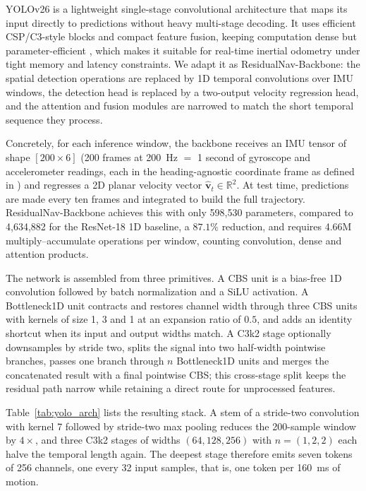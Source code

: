 \documentclass[10pt,conference,letterpaper]{IEEEtran}
\begin{document}
YOLOv26 is a lightweight single-stage convolutional architecture that
maps its input directly to predictions without heavy multi-stage
decoding. It uses efficient CSP/C3-style blocks and compact feature
fusion, keeping computation dense but parameter-efficient
\cite{yolo26_2025}, which makes it suitable for real-time inertial
odometry under tight memory and latency constraints. We adapt it as
ResidualNav-Backbone: the spatial detection operations are replaced by 1D
temporal convolutions over IMU windows, the detection head is replaced
by a two-output velocity regression head, and the attention and fusion
modules are narrowed to match the short temporal sequence they process.

Concretely, for each inference window, the backbone receives an IMU
tensor of shape $[200 \times 6]$ (200 frames at 200~Hz $=$ 1 second
of gyroscope and accelerometer readings, each in the heading-agnostic
coordinate frame as defined in \cite{ronin2019}) and regresses a 2D
planar velocity vector $\hat{\mathbf{v}}_t \in \mathbb{R}^2$. At test
time, predictions are made every ten frames and integrated to build
the full trajectory. ResidualNav-Backbone achieves this with only 598,530
parameters, compared to 4,634,882 for the ResNet-18 1D baseline, a
$\mathbf{87.1\%}$ reduction, and requires 4.66M multiply--accumulate
operations per window, counting convolution, dense and attention
products.

The network is assembled from three primitives. A CBS unit is a
bias-free 1D convolution followed by batch normalization and a SiLU
activation. A Bottleneck1D unit contracts and restores channel width
through three CBS units with kernels of size 1, 3 and 1 at an expansion
ratio of $0.5$, and adds an identity shortcut when its input and output
widths match. A C3k2 stage optionally downsamples by stride two, splits
the signal into two half-width pointwise branches, passes one branch
through $n$ Bottleneck1D units and merges the concatenated result with
a final pointwise CBS; this cross-stage split keeps the residual path
narrow while retaining a direct route for unprocessed features.

Table~\ref{tab:yolo_arch} lists the resulting stack. A stem of a
stride-two convolution with kernel 7 followed by stride-two max pooling
reduces the 200-sample window by $4\times$, and three C3k2 stages of
widths $(64,128,256)$ with $n=(1,2,2)$ each halve the temporal length
again. The deepest stage therefore emits seven tokens of 256 channels,
one every 32 input samples, that is, one token per 160~ms of motion.
\end{document}
